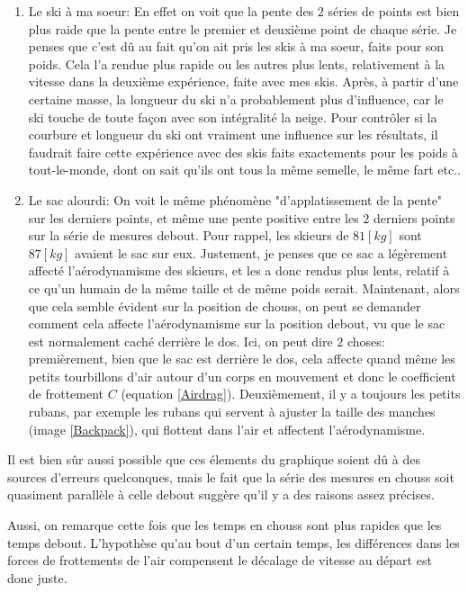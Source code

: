 \documentclass{article}
\begin{document}
\begin{enumerate}
    \item Le ski à ma soeur: En effet on voit que la pente des $2$ séries de points est bien plus raide que la pente entre le premier et deuxième point de chaque série. Je penses que c'est dû au fait qu'on ait pris les skis à ma soeur, faits pour son poids. Cela l'a rendue plus rapide ou les autres plus lents, relativement à la vitesse dans la deuxième expérience, faite avec mes skis. Après, à partir d'une certaine masse, la longueur du ski n'a probablement plus d'influence, car le ski touche de toute façon avec son intégralité la neige. Pour contrôler si la courbure et longueur du ski ont vraiment une influence sur les résultats, il faudrait faire cette expérience avec des skis faits exactements pour les poids à tout-le-monde, dont on sait qu'ils ont tous la même semelle, le même fart etc..
    
    \item Le sac alourdi: On voit le même phénomène "d'applatissement de la pente" sur les derniers points, et même une pente positive entre les $2$ derniers points sur la série de mesures debout. Pour rappel, les skieurs de $81[kg]$ sont $87[kg]$ avaient le sac sur eux. Justement, je penses que ce sac a légèrement affecté l'aérodynamisme des skieurs, et les a donc rendus plus lents, relatif à ce qu'un humain de la même taille et de même poids serait. Maintenant, alors que cela semble évident sur la position de chouss, on peut se demander comment cela affecte l'aérodynamisme sur la position debout, vu que le sac est normalement caché derrière le dos. Ici, on peut dire $2$ choses: premièrement, bien que le sac est derrière le dos, cela affecte quand même les petits tourbillons d'air autour d'un corps en mouvement et donc le coefficient de frottement $C$ (equation \ref{Airdrag}). Deuxièmement, il y a toujours les petits rubans, par exemple les rubans qui servent à ajuster la taille des manches (image \ref{Backpack}), qui flottent dans l'air et affectent l'aérodynamisme. 
\end{enumerate}

Il est bien sûr aussi possible que ces élements du graphique soient dû à des sources d'erreurs quelconques, mais le fait que la série des mesures en chouss soit quasiment parallèle à celle debout suggère qu'il y a des raisons assez précises.

\vspace{0.3cm}

Aussi, on remarque cette fois que les temps en chouss sont plus rapides que les temps debout. L'hypothèse qu'au bout d'un certain temps, les différences dans les forces de frottements de l'air compensent le décalage de vitesse au départ est donc juste.
\end{document}
